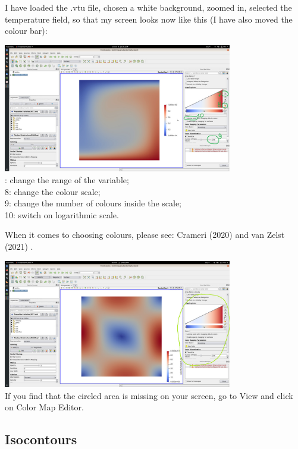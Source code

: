 I have loaded the .vtu file, chosen a white background, zoomed in, selected the temperature field, so that 
my screen looks now like this (I have also moved the colour bar):

\begin{center}
\includegraphics[width=10cm]{images/paraview/p5}\\
{: change the range of the variable; \\
8: change the colour scale; \\
9: change the number of colours inside the scale; \\
10: switch on logarithmic scale.}
\end{center}

When it comes to choosing colours, please see: 
Crameri \etal (2020) \cite{crsh20} and van Zelst \etal (2021) \cite{vacp21}.


\begin{center}
\includegraphics[width=10cm]{images/paraview/p11}\\
{\captionfont If you find that the circled area is missing on your screen, 
go to View and click on Color Map Editor.}
\end{center}


\subsection*{Isocontours}

